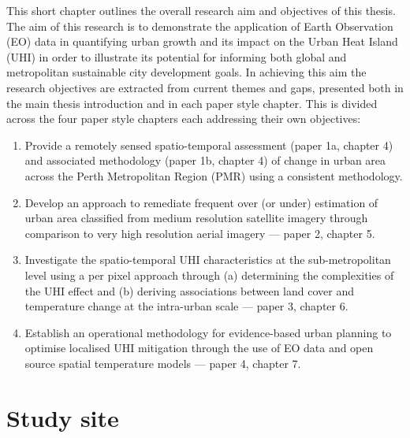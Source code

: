 \documentclass[]{book}
\begin{document}
This short chapter outlines the overall research aim and objectives of
this thesis. The aim of this research is to demonstrate the application
of Earth Observation (EO) data in quantifying urban growth and its
impact on the Urban Heat Island (UHI) in order to illustrate its
potential for informing both global and metropolitan sustainable city
development goals. In achieving this aim the research objectives are
extracted from current themes and gaps, presented both in the main
thesis introduction and in each paper style chapter. This is divided
across the four paper style chapters each addressing their own
objectives:

\begin{enumerate}
\def\labelenumi{\arabic{enumi}.}
\item
  Provide a remotely sensed spatio-temporal assessment (paper 1a,
  chapter 4) and associated methodology (paper 1b, chapter 4) of change
  in urban area across the Perth Metropolitan Region (PMR) using a
  consistent methodology.
\item
  Develop an approach to remediate frequent over (or under) estimation
  of urban area classified from medium resolution satellite imagery
  through comparison to very high resolution aerial imagery --- paper 2,
  chapter 5.
\item
  Investigate the spatio-temporal UHI characteristics at the
  sub-metropolitan level using a per pixel approach through (a)
  determining the complexities of the UHI effect and (b) deriving
  associations between land cover and temperature change at the
  intra-urban scale --- paper 3, chapter 6.
\item
  Establish an operational methodology for evidence-based urban planning
  to optimise localised UHI mitigation through the use of EO data and
  open source spatial temperature models --- paper 4, chapter 7.
\end{enumerate}

\section{Study site}\label{study-site}
\end{document}
